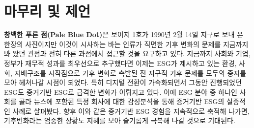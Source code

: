 \documentclass[smallextended]{svjour3}       %
\begin{document}
\hypertarget{esg-data-science-conclusion}{%
\section{마무리 및 제언}\label{esg-data-science-conclusion}}

\textbf{창백한 푸른 점(Pale Blue Dot)}은 보이저 1호가 1990년 2월 14일
지구로 보내 온 한장의 사진이지만 이것이 시사하는 바는 인류가 직면한 기후
변화의 문제를 지금까지 봐 왔던 관점과 전혀 다른 과점에서 접근할 것을
요구하고 있다. 지금까지 사회와 기업, 정부가 재무적 성과를 최우선으로
추구했다면 이제는 ESG가 제시하고 있는 환경, 사회, 지배구조를 시작점으로
기후 변화로 촉발된 전 지구적 기후 문제를 모두의 중지를 모아 헤쳐나갈
시점이 되었다. 특히 디지털 전환이 가속화되면서 그동안 진행되었던 ESG도
증거기반 ESG로 급격한 변화가 이뤄지고 있다. 이에 ESG 분야 중 하나인
사회를 골라 뉴스에 포함된 특정 회사에 대한 감성분석을 통해 증거기반
ESG의 실증적인 사례로 살펴봤다. 향후 이와 같은 증거기반 ESG 경험을
지속적으로 축적해 나가면, 기후변화라는 엄중한 상황도 지혜를 모아
슬기롭게 극복해 나갈 것으로 기대된다.




\end{document}
